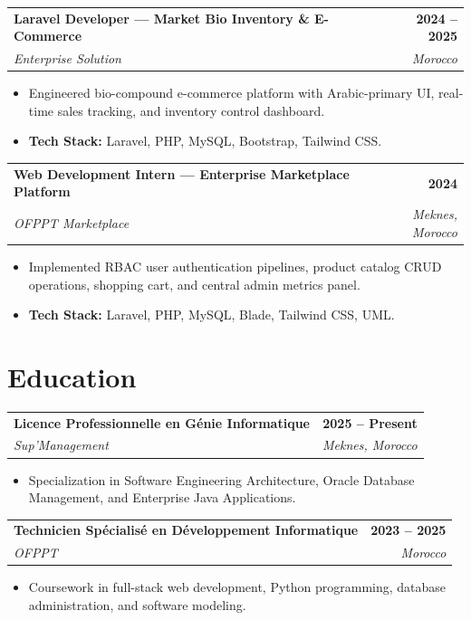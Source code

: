 \documentclass[a4paper,10pt]{article}
\makeatletter
\newcommand{\experienceHeader}[4]{
  \noindent
  \begin{tabularx}{\textwidth}{@{}X r@{}}
    \textbf{\color{primary} #1} & \textbf{\color{textdark}\small #2} \\
    \textit{\small\color{textgray} #3} & \textit{\small\color{textgray} #4} \\
  \end{tabularx}
  \vspace{-3pt}
}
\newcommand{\educationHeader}[4]{
  \noindent
  \begin{tabularx}{\textwidth}{@{}X r@{}}
    \textbf{\color{primary} #1} & \textbf{\color{textdark}\small #2} \\
    \textit{\small\color{textgray} #3} & \textit{\small\color{textgray} #4} \\
  \end{tabularx}
  \vspace{-3pt}
}
\makeatother
\begin{document}
\vspace{3pt}

\experienceHeader{Laravel Developer --- Market Bio Inventory \& E-Commerce}{2024 -- 2025}{Enterprise Solution}{Morocco}
\begin{itemize}
    \item Engineered bio-compound e-commerce platform with Arabic-primary UI, real-time sales tracking, and inventory control dashboard.
    \item \textbf{Tech Stack:} Laravel, PHP, MySQL, Bootstrap, Tailwind CSS.
\end{itemize}

\vspace{3pt}

\experienceHeader{Web Development Intern --- Enterprise Marketplace Platform}{2024}{OFPPT Marketplace}{Meknes, Morocco}
\begin{itemize}
    \item Implemented RBAC user authentication pipelines, product catalog CRUD operations, shopping cart, and central admin metrics panel.
    \item \textbf{Tech Stack:} Laravel, PHP, MySQL, Blade, Tailwind CSS, UML.
\end{itemize}

\section{Education}

\educationHeader{Licence Professionnelle en Génie Informatique}{2025 -- Present}{Sup'Management}{Meknes, Morocco}
\begin{itemize}
    \item Specialization in Software Engineering Architecture, Oracle Database Management, and Enterprise Java Applications.
\end{itemize}

\vspace{2pt}

\educationHeader{Technicien Spécialisé en Développement Informatique}{2023 -- 2025}{OFPPT}{Morocco}
\begin{itemize}
    \item Coursework in full-stack web development, Python programming, database administration, and software modeling.
\end{itemize}
\end{document}
